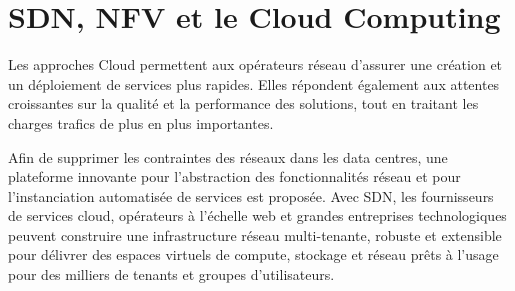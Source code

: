 


\section{SDN, NFV et le Cloud Computing}

Les approches Cloud permettent aux opérateurs réseau d'assurer une création et un déploiement de services plus rapides. Elles répondent également aux attentes croissantes sur la qualité et la performance des solutions, tout en traitant les charges trafics de plus en plus importantes.



Afin de supprimer les contraintes des réseaux dans les data centres, une plateforme innovante pour l'abstraction des fonctionnalités réseau et pour l'instanciation automatisée de services est proposée. Avec SDN, les fournisseurs de services cloud, opérateurs à l'échelle web et grandes entreprises technologiques peuvent construire une infrastructure réseau multi-tenante, robuste et extensible pour délivrer des espaces virtuels de compute, stockage et réseau prêts à l'usage pour des milliers de tenants et groupes d'utilisateurs.

